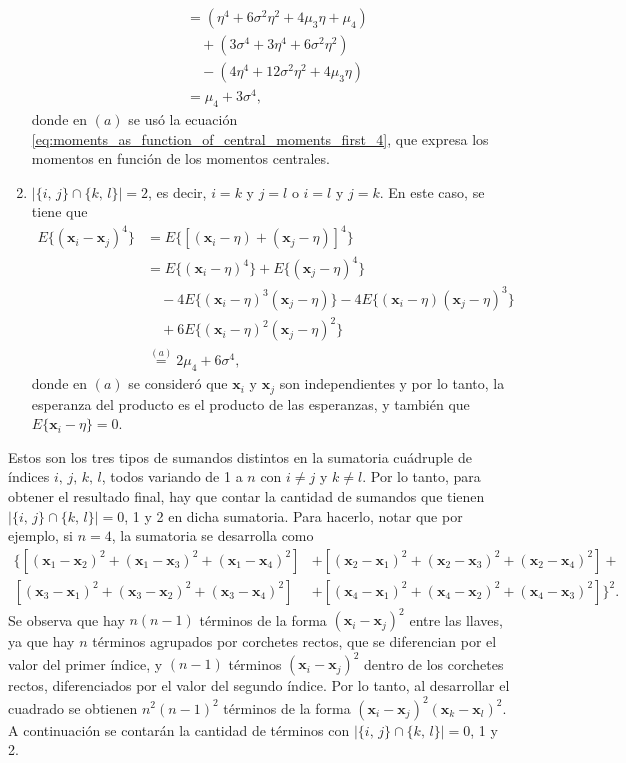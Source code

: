 \documentclass[a4paper]{report}
\newcommand{\x}{\mathbf{x}}
\begin{document}
\begin{enumerate}
\begin{align*}
   &=(\eta^4+6\sigma^2\eta^2+4\mu_3\eta+\mu_4)\\
   &\quad+(3\sigma^4+3\eta^4+6\sigma^2\eta^2)\\
   &\quad-(4\eta^4+12\sigma^2\eta^2+4\mu_3\eta)\\
   &=\mu_4+3\sigma^4,
 \end{align*}
 donde en \((a)\) se usó la ecuación \ref{eq:moments_as_function_of_central_moments_first_4}, que expresa los momentos en función de los momentos centrales.
 \item \(|\{i,\,j\}\cap\{k,\,l\}|=2\), es decir, \(i=k\) y \(j=l\) o \(i=l\) y \(j=k\). En este caso, se tiene que
 \begin{align*}
  E\{(\x_i-\x_j)^4\}&=E\{\left[(\x_i-\eta)+(\x_j-\eta)\right]^4\}\\
    &=E\{(\x_i-\eta)^4\}+E\{(\x_j-\eta)^4\}\\
    &\quad-4E\{(\x_i-\eta)^3(\x_j-\eta)\}-4E\{(\x_i-\eta)(\x_j-\eta)^3\}\\
    &\quad+6E\{(\x_i-\eta)^2(\x_j-\eta)^2\}\\
    &\overset{(a)}{=}2\mu_4+6\sigma^4,
 \end{align*}
donde en \((a)\) se consideró que \(\x_i\) y \(\x_j\) son independientes y por lo tanto, la esperanza del producto es el producto de las esperanzas, y también que \(E\{\x_i-\eta\}=0\).
 \end{enumerate}
Estos son los tres tipos de sumandos distintos en la sumatoria cuádruple de índices \(i,\,j,\,k,\,l\), todos variando de 1 a \(n\) con \(i\neq j\) y \(k\neq l\). Por lo tanto, para obtener el resultado final, hay que contar la cantidad de sumandos que tienen \(|\{i,\,j\}\cap\{k,\,l\}|=0\), 1 y 2 en dicha sumatoria. Para hacerlo, notar que por ejemplo, si \(n=4\), la sumatoria se desarrolla como
\begin{align*}
 \bigl\{\left[(\x_1-\x_2)^2+(\x_1-\x_3)^2+(\x_1-\x_4)^2\right]&+\left[(\x_2-\x_1)^2+(\x_2-\x_3)^2+(\x_2-\x_4)^2\right]+\\
 \left[(\x_3-\x_1)^2+(\x_3-\x_2)^2+(\x_3-\x_4)^2\right]&+\left[(\x_4-\x_1)^2+(\x_4-\x_2)^2+(\x_4-\x_3)^2\right]\bigr\}^2.
\end{align*}
Se observa que hay \(n(n-1)\) términos de la forma \((\x_i-\x_j)^2\) entre las llaves, ya que hay \(n\) términos agrupados por corchetes rectos, que se diferencian por el valor del primer índice, y \((n-1)\) términos \((\x_i-\x_j)^2\) dentro de los corchetes rectos, diferenciados por el valor del segundo índice. Por lo tanto, al desarrollar el cuadrado se obtienen \(n^2(n-1)^2\) términos de la forma \((\x_i-\x_j)^2(\x_k-\x_l)^2\). A continuación se contarán la cantidad de términos con \(|\{i,\,j\}\cap\{k,\,l\}|=0\), 1 y 2.
\end{document}

